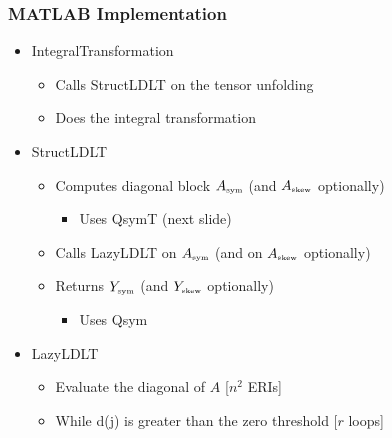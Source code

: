 \documentclass[bigger]{beamer}
\begin{document}
\begin{frame}
\frametitle{MATLAB Implementation}
\label{sec-1-27}
\begin{itemize}

\item IntegralTransformation
\label{sec-1-27-1}%
\begin{itemize}

\item Calls StructLDLT on the tensor unfolding
\label{sec-1-27-1-1}%

\item Does the integral transformation
\label{sec-1-27-1-2}%
\end{itemize} %

\item StructLDLT
\label{sec-1-27-2}%
\begin{itemize}

\item Computes diagonal block $A_{\mbox{\tiny sym}}$ (and $A_{\mbox{\tiny skew}}$ optionally)
\label{sec-1-27-2-1}%
\begin{itemize}

\item Uses QsymT (next slide)
\label{sec-1-27-2-1-1}%
\end{itemize} %

\item Calls LazyLDLT on $A_{\mbox{\tiny sym}}$ (and on $A_{\mbox{\tiny skew}}$ optionally)
\label{sec-1-27-2-2}%

\item Returns $Y_{\mbox{\tiny sym}}$ (and $Y_{\mbox{\tiny skew}}$ optionally)
\label{sec-1-27-2-3}%
\begin{itemize}

\item Uses Qsym
\label{sec-1-27-2-3-1}%
\end{itemize} %
\end{itemize} %

\item LazyLDLT
\label{sec-1-27-3}%
\begin{itemize}

\item Evaluate the diagonal of $A$ [$n^2$ ERIs]
\label{sec-1-27-3-1}%

\item While d(j) is greater than the zero threshold [$r$ loops]
\label{sec-1-27-3-2}%
\begin{itemize}


\end{itemize}
\end{itemize}
\end{itemize}
\end{frame}
\end{document}
